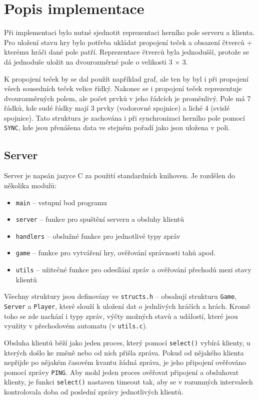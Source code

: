 \documentclass[11pt,a4paper]{article}
\begin{document}
\section{Popis implementace}
Při implementaci bylo nutné sjednotit reprezentaci herního pole serveru a klienta. Pro uložení stavu hry bylo potřeba ukládat propojení teček a obsazení čtverců + kterému hráči dané pole patří. Reprezentace čtverců byla jednodušší, protože se dá jednoduše uložit na dvourozměrné pole o velikosti 3 $\times$ 3. 

K propojení teček by se dal použít například graf, ale ten by byl i při propojení všech sousedních teček velice řídký. Nakonec se i propojení teček reprezentuje dvourozměrných polem, ale počet prvků v jeho řádcích je proměnlivý. Pole má 7 řádků, kde sudé řádky mají 3 prvky (vodorovné spojnice) a liché 4 (svislé spojnice). Tato struktura je zachována i při synchronizaci herního pole pomocí \texttt{SYNC}, kde jsou přenášena data ve stejném pořadí jako jsou uložena v poli.

\subsection{Server}
Server je napsán jazyce C za použití standardních knihoven. Je rozdělen do několika modulů:
\begin{itemize}
	\item \texttt{main} -- vstupní bod programu
	\item \texttt{server} -- funkce pro spuštění serveru a obsluhy klientů
	\item \texttt{handlers} -- obslužné funkce pro jednotlivé typy zpráv
	\item \texttt{game} -- funkce pro vytváření hry, ověřování správnosti tahů apod.
	\item \texttt{utils} -- užitečné funkce pro odesílání zpráv a ověřování přechodů mezi stavy klientů
\end{itemize}
Všechny struktury jsou definovány ve \texttt{structs.h} -- obsahují strukturu \texttt{Game}, \texttt{Server} a \texttt{Player}, které slouží k uložení dat o jednlivých hráčích a hrách. Kromě toho se zde nachází i typy zpráv, výčty možných stavů a událostí, které jsou využity v přechodovém automatu (v \texttt{utils.c}).

Obsluha klientů běží jako jeden proces, který pomocí \texttt{select()} vybírá klienty, u kterých došlo ke změně nebo od nich přišla zpráva. Pokud od nějakého klienta nepřijde po nějakém časovém kvantu žádná zpráva, je jeho připojení ověřováno pomocí zprávy \texttt{PING}. Aby mohl jeden proces ověřovat připojení a obsluhovat klienty, je funkci \texttt{select()} nastaven timeout tak, aby se v rozumných intervalech kontrolovala doba od poslední zprávy jednotlivých klientů.
\end{document}
